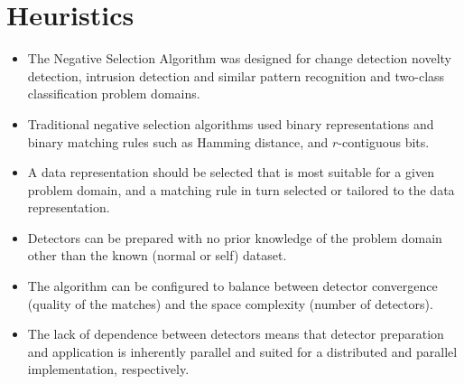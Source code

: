\documentclass[a4paper, 11pt]{article}
\begin{document}
\section{Heuristics}
\label{sec:heuristics}
\begin{itemize}
	\item The Negative Selection Algorithm was designed for change detection novelty detection, intrusion detection and similar pattern recognition and two-class classification problem domains.
	\item Traditional negative selection algorithms used binary representations and binary matching rules such as Hamming distance, and $r$-contiguous bits.
	\item A data representation should be selected that is most suitable for a given problem domain, and a matching rule in turn selected or tailored to the data representation.
	\item Detectors can be prepared with no prior knowledge of the problem domain other than the known (normal or self) dataset. 
	\item The algorithm can be configured to balance between detector convergence (quality of the matches) and the space complexity (number of detectors).
	\item The lack of dependence between detectors means that detector preparation and application is inherently parallel and suited for a distributed and parallel implementation, respectively.
\end{itemize}

\end{document}
